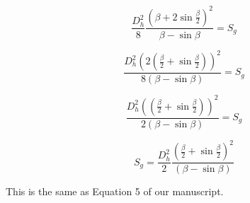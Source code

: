 \documentclass[11pt]{article}
\begin{document}
\begin{itemize}
  \begin{equation}
    \frac{D_h^2}{8} \frac{(\beta+2\sin\frac{\beta}{2})^2}{\beta - \sin \beta} = S_g
  \end{equation}

  \begin{equation}
    \frac{D_h^2 (2(\frac{\beta}{2}+\sin \frac{\beta}{2}))^2}{8(\beta - \sin \beta)} = S_g
  \end{equation}


   \begin{equation}
    \frac{D_h^2 ((\frac{\beta}{2}+\sin \frac{\beta}{2}))^2}{2(\beta - \sin \beta)} = S_g
  \end{equation}


  \begin{equation}
       S_g = \frac{D_h^2}{2} \frac{(\frac{\beta}{2}+\sin \frac{\beta}{2})^2}{(\beta - \sin \beta)}  
  \end{equation}

  This is the same as Equation 5 of our manuscript.

  

\end{itemize}

 

\end{document}
